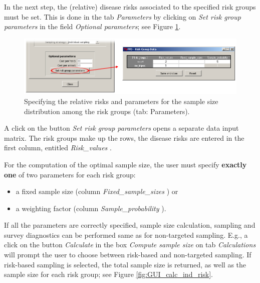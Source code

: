 \documentclass[nojss]{jss}
\begin{document}
In the next step, the (relative) disease risks associated to the specified risk groups must be set. This is done in the tab \emph{Parameters}  by clicking on  \emph{Set risk group parameters} in the field  \emph{Optional parameters}; see Figure \ref{fig:GUI_Risk_Data}.

\begin{figure}[h!t]
\begin{center}
\includegraphics[width=125mm]{GUI_Risk_Data.png}
\end{center}
\caption{Specifying the relative risks and parameters for the sample size distribution among the risk groups (tab: Parameters).}
\label{fig:GUI_Risk_Data} \end{figure}

A click on the button \emph{Set risk group parameters} opens a separate data input matrix. The risk groups make up the rows, the disease risks are entered in the first column, entitled \emph{Risk\_values} .

For the computation of the optimal sample size, the user must specify \textbf{exactly one} of two parameters for each risk group:
%
\begin{itemize}
\item a fixed sample size (column \emph{Fixed\_sample\_sizes} ) or
\item a weighting factor (column \emph{Sample\_probability} ).
\end{itemize}
%

If all the parameters are correctly specified, sample size calculation, sampling and survey diagnostics can be performed same as for non-targeted sampling. E.g., a click on the button \emph{Calculate} in the box \emph{Compute sample size} on tab \emph{Calculations} will prompt the user to choose between risk-based and non-targeted sampling. If risk-based sampling is selected, the total sample size is returned, as well as the sample size for each risk group; see Figure \ref{fig:GUI_calc_ind_risk}.
\end{document}
